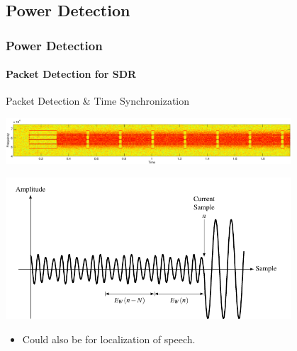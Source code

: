\subsection{Power Detection}
\begin{frame} \frametitle{Power Detection}
    \framesubtitle{Packet Detection for SDR}
    \begin{block}{Packet Detection \& Time Synchronization}    
        \begin{center}
            \includegraphics[width=0.8\textwidth]{img/packet_from_recording}
        \end{center}
        \begin{center}
            \includegraphics[width=0.8\textwidth]{img/dsw4} 
        \end{center}
        \begin{itemize}
            \item Could also be for localization of speech.
        \end{itemize}
    \end{block}
\end{frame}

